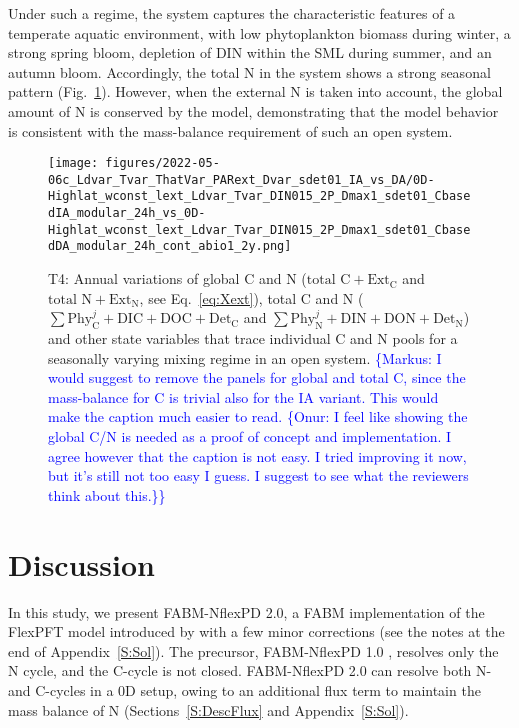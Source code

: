 \documentclass[gmd, manuscript]{copernicus}
\newcommand{\onur}[1]{\textcolor{blue}{\{Onur: #1\}}}
\newcommand{\markus}[1]{\textcolor{blue}{\{Markus: #1\}}}
\begin{document}
Under such a regime, the system captures the characteristic features of a temperate aquatic environment, with low phytoplankton biomass during winter, a strong spring bloom, depletion of DIN within the SML during summer, and an autumn bloom. Accordingly, the total N in the system shows a strong seasonal pattern (Fig.~\ref{f.T4res}). However, when the external N is taken into account, the global amount of N is conserved by the model, demonstrating that the model behavior is consistent with the mass-balance requirement of such an open system.

\begin{figure}[ht!]
\texttt{[image: figures/2022-05-06c\_Ldvar\_Tvar\_ThatVar\_PARext\_Dvar\_sdet01\_IA\_vs\_DA/0D-Highlat\_wconst\_lext\_Ldvar\_Tvar\_DIN015\_2P\_Dmax1\_sdet01\_CbasedIA\_modular\_24h\_vs\_0D-Highlat\_wconst\_lext\_Ldvar\_Tvar\_DIN015\_2P\_Dmax1\_sdet01\_CbasedDA\_modular\_24h\_cont\_abio1\_2y.png]}
\caption{T4: Annual variations of global C and N ($\text{total C} + \text{Ext}_{\text{C}}$ and $\text{total N} + \text{Ext}_{\text{N}}$, see Eq.~\ref{eq:Xext}), total C and N ($\sum\text{Phy}_{\text{C}}^j + \text{DIC} + \text{DOC} + \text{Det}_{\text{C}}$ and $\sum\text{Phy}_{\text{N}}^j + \text{DIN} + \text{DON} + \text{Det}_{\text{N}}$) and other state variables that trace individual C and N pools for a seasonally varying mixing regime in an open system. \markus{I would suggest to remove the panels for global and total C, since the mass-balance for C is trivial also for the IA variant.  This would make the caption much easier to read. \onur{I feel like showing the global C/N is needed as a proof of concept and implementation. I agree however that the caption is not easy. I tried improving it now, but it's still not too easy I guess. I suggest to see what the reviewers think about this.}}}\label{f.T4res}
\end{figure}


%

\FloatBarrier%
\section{Discussion}

In this study, we present FABM-NflexPD 2.0, a FABM implementation of the FlexPFT model introduced by \citet{Smith2016} with a few minor corrections (see the notes at the end of Appendix~\ref{S:Sol}). The precursor, FABM-NflexPD 1.0 \citep{Kerimoglu2021}, resolves only the N cycle, and the C-cycle is not closed.  FABM-NflexPD 2.0 can resolve both N- and C-cycles in a 0D setup, owing to an additional flux term to maintain the mass balance of N (Sections~\ref{S:DescFlux} and Appendix~\ref{S:Sol}).
\end{document}
